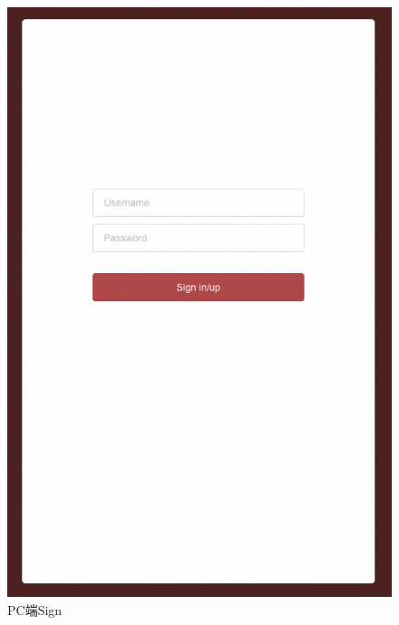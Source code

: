 \documentclass[hyperref]{ctexart}
\begin{document}
\begin{multicols}{2}
    \begin{figure}[H]
        \centering
        \includegraphics[scale=0.2]{figure/14.png}
        \caption{PC端Sign}
        \label{Fig.1.14}
    \end{figure}
    \begin{figure}[H]
        \centering

\end{figure}
\end{multicols}
\end{document}

